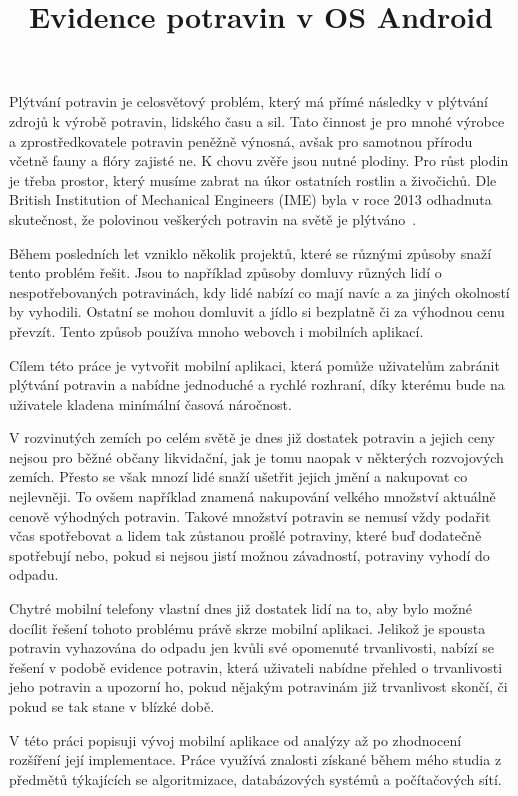 \documentclass[thesis=B,czech]{FITthesis}[2013/10/20]
\title{Evidence potravin v OS Android}
\begin{document}

\begin{introduction}

Plýtvání potravin je celosvětový problém, který má přímé následky v plýtvání zdrojů k výrobě potravin, lidského času a sil. Tato činnost je pro mnohé výrobce a zprostředkovatele potravin peněžně výnosná, avšak pro samotnou přírodu včetně fauny a flóry zajisté ne. K chovu zvěře jsou nutné plodiny. Pro růst plodin je třeba prostor, který musíme zabrat na úkor ostatních rostlin a živočichů. Dle British Institution of Mechanical Engineers (IME) byla v roce 2013 odhadnuta skutečnost, že polovinou veškerých potravin na světě je plýtváno~\cite{fakta}.

Během posledních let vzniklo několik projektů, které se různými způsoby snaží tento problém řešit. Jsou to například způsoby domluvy různých lidí o nespotřebovaných potravinách, kdy lidé nabízí co mají navíc a za jiných okolností by vyhodili. Ostatní se mohou domluvit a jídlo si bezplatně či za výhodnou cenu převzít. Tento způsob používa mnoho webovch i mobilních aplikací.

Cílem této práce je vytvořit mobilní aplikaci, která pomůže uživatelům zabránit plýtvání potravin a nabídne jednoduché a rychlé rozhraní, díky kterému bude na uživatele kladena minímální časová náročnost.

V rozvinutých zemích po celém světě je dnes již dostatek potravin a jejich ceny nejsou pro běžné občany likvidační, jak je tomu naopak v některých rozvojových zemích. Přesto se však mnozí lidé snaží ušetřit jejich jmění a nakupovat co nejlevněji. To ovšem například znamená nakupování velkého množství aktuálně cenově výhodných potravin. Takové množství potravin se nemusí vždy podařit včas spotřebovat a lidem tak zůstanou prošlé potraviny, které buď dodatečně spotřebují nebo, pokud si nejsou jistí možnou závadností, potraviny vyhodí do odpadu.

Chytré mobilní telefony vlastní dnes již dostatek lidí na to, aby bylo možné docílit řešení tohoto problému právě skrze mobilní aplikaci. Jelikož je spousta potravin vyhazována do odpadu jen kvůli své opomenuté trvanlivosti, nabízí se řešení v podobě evidence potravin, která uživateli nabídne přehled o trvanlivosti jeho potravin a upozorní ho, pokud nějakým potravinám již trvanlivost skončí, či pokud se tak stane v blízké době.

V této práci popisuji vývoj mobilní aplikace od analýzy až po zhodnocení rozšíření její implementace. Práce využívá znalosti získané během mého studia z předmětů týkajících se algoritmizace, databázových systémů a počítačových sítí.

\end{introduction}
\end{document}

